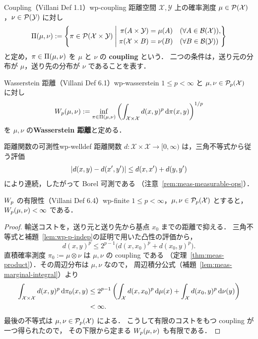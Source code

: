 \begin{definition}{Coupling（Villani Def 1.1）}{wp-coupling}
  距離空間 $\mathcal{X},\mathcal{Y}$ 上の確率測度
  $\mu\in\mathcal{P}(\mathcal{X})$，$\nu\in\mathcal{P}(\mathcal{Y})$ に対し
  \[
    \Pi(\mu,\nu)
    :=
    \left\{
      \pi\in\mathcal{P}(\mathcal{X}\times\mathcal{Y})
      \;\middle|\;
      \begin{aligned}
        \pi(A\times\mathcal{Y})&=\mu(A) &&(\forall A\in\mathcal{B}(\mathcal{X})),\\
        \pi(\mathcal{X}\times B)&=\nu(B) &&(\forall B\in\mathcal{B}(\mathcal{Y}))
      \end{aligned}
    \right\}
  \]
  と定め，$\pi\in\Pi(\mu,\nu)$ を $\mu$ と $\nu$ の
  \textbf{coupling} という．
  二つの条件は，送り元の分布が $\mu$，送り先の分布が $\nu$ であることを表す．
\end{definition}

\begin{definition}{Wasserstein 距離（Villani Def 6.1）}{wp-wasserstein}
  $1\leq p<\infty$ と $\mu,\nu\in\mathcal{P}_{p}(\mathcal{X})$ に対し
  \[
    W_p(\mu,\nu)
    :=
    \inf_{\pi\in\Pi(\mu,\nu)}
    \left(
      \int_{\mathcal{X}\times \mathcal{X}}d(x,y)^p\,\mathrm{d}\pi(x,y)
    \right)^{1/p}
  \]
  を $\mu,\nu$ の\textbf{Wasserstein 距離}と定める．
\end{definition}

\begin{remark}{距離関数の可測性}{wp-welldef}
  距離関数 $d\colon \mathcal{X}\times \mathcal{X}\to[0,\infty)$ は，三角不等式から従う評価
  \[
    \lvert d(x,y)-d(x',y') \rvert\leq d(x,x')+d(y,y')
  \]
  により連続，したがって Borel 可測である
  （注意~\ref{rem:meas-measurable-ops}）．
\end{remark}

\begin{lemma}{$W_p$ の有限性（Villani Def 6.4）}{wp-finite}
  $1\leq p<\infty$，$\mu,\nu\in\mathcal{P}_{p}(\mathcal{X})$ とすると，
  $W_p(\mu,\nu)<\infty$ である．
\end{lemma}

\begin{proof}
  輸送コストを，送り元と送り先から基点 $x_0$ までの距離で抑える．
  三角不等式と補題~\ref{lem:wp-p-indep}の証明で用いた凸性の評価から，
  \[
    d(x,y)^p\leq2^{p-1}\bigl(d(x,x_0)^p+d(x_0,y)^p\bigr).
  \]
  直積確率測度 $\pi_0:=\mu\otimes\nu$ は $\mu,\nu$ の coupling である
  （定理~\ref{thm:meas-product}）．その周辺分布は $\mu,\nu$ なので，
  周辺積分公式（補題~\ref{lem:meas-marginal-integral}）より
  \[
    \begin{aligned}
      \int_{\mathcal{X}\times\mathcal{X}}d(x,y)^p\,\mathrm{d}\pi_0(x,y)
      &\leq2^{p-1}\left(
        \int_\mathcal{X}d(x,x_0)^p\,\mathrm{d}\mu(x)
        +\int_\mathcal{X}d(x_0,y)^p\,\mathrm{d}\nu(y)
      \right)\\
      &<\infty.
    \end{aligned}
  \]
  最後の不等式は $\mu,\nu\in\mathcal{P}_{p}(\mathcal{X})$ による．
  こうして有限のコストをもつ coupling が一つ得られたので，
  その下限から定まる $W_p(\mu,\nu)$ も有限である．
\end{proof}

